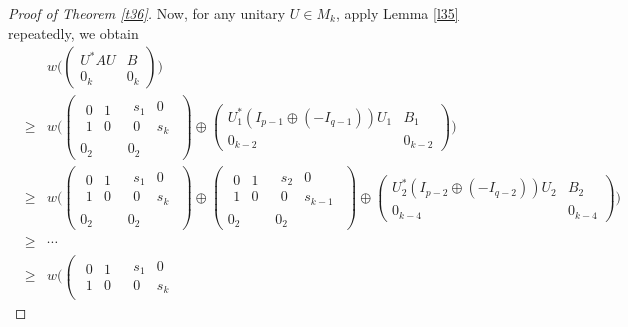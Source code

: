 \documentclass[10pt,a4paper]{amsart}
\begin{document}
\begin{proof}[Proof of Theorem \ref{t36}]
Now, for any unitary $U\in M_k$, apply Lemma \ref{l35} repeatedly, we obtain
\begin{eqnarray*}
& & w\Big(\begin{pmatrix} U^*AU & B\\ 0_k & 0_k\end{pmatrix}\Big)   \\
& \ge & w\Big(\left(\begin{array}{c|c}\begin{array}{cc} 0 & 1\\ 1 & 0\end{array} & \begin{array}{cc} s_1 & 0\\ 0 & s_k\end{array}
\\ \hline 0_2 & 0_2\end{array}\right)\oplus
\begin{pmatrix} U_1^*(I_{p-1}\oplus (-I_{q-1}))U_1 & B_1\\ 0_{k-2} & 0_{k-2}\end{pmatrix}\Big) \\
& \ge & w\Big(\left(\begin{array}{c|c}\begin{array}{cc} 0 & 1\\ 1 & 0\end{array} & \begin{array}{cc} s_1 & 0\\ 0 & s_k\end{array}
\\ \hline 0_2 & 0_2\end{array}\right)\oplus
\left(\begin{array}{c|c}\begin{array}{cc} 0 & 1\\ 1 & 0\end{array} & \begin{array}{cc} s_2 & 0\\ 0 & s_{k-1}\end{array}
\\ \hline 0_2 & 0_2\end{array}\right) \oplus
\begin{pmatrix} U_2^*(I_{p-2}\oplus (-I_{q-2}))U_2 & B_2\\ 0_{k-4} & 0_{k-4}\end{pmatrix}\Big) \\
& \ge & \cdots \\
& \ge & w\Big(\left(\begin{array}{c|c}\begin{array}{cc} 0 & 1\\ 1 & 0\end{array} & \begin{array}{cc} s_1 & 0\\ 0 & s_k\end{array}

\end{array}
\end{eqnarray*}
\end{proof}
\end{document}
